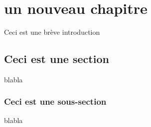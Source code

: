 \chapter{un nouveau chapitre}


\minitoc
Ceci est une brève introduction

\section{Ceci est une section}


blabla

\subsection{Ceci est une sous-section}
blabla